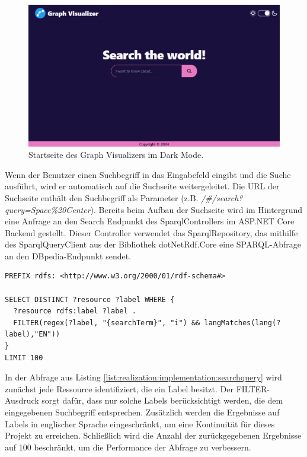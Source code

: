 \begin{figure}[h]
    \centering
    \includegraphics[height=.5\textwidth]{images/03/HomePageDark.png}
    \caption{Startseite des Graph Visualizers im Dark Mode.}
    \label{fig:realization:implementation:homepagedark}
\end{figure}

Wenn der Benutzer einen Suchbegriff in das Eingabefeld eingibt und die Suche ausführt, wird er automatisch auf die Suchseite weitergeleitet. Die URL der Suchseite enthält den Suchbegriff als Parameter (z.B. \textit{/\#/search?query=Space\%20Center}). Bereits beim Aufbau der Suchseite wird im Hintergrund eine Anfrage an den Search Endpunkt des SparqlControllers im ASP.NET Core Backend gestellt. Dieser Controller verwendet das SparqlRepository, das mithilfe des SparqlQueryClient aus der Bibliothek dotNetRdf.Core eine SPARQL-Abfrage an den DBpedia-Endpunkt sendet.

\begin{lstlisting}[caption={SPARQL-Abfrage zur Filterung von Ressourcen anhand des Labels}, label={list:realization:implementation:searchquery}]
PREFIX rdfs: <http://www.w3.org/2000/01/rdf-schema#>

SELECT DISTINCT ?resource ?label WHERE {
  ?resource rdfs:label ?label .
  FILTER(regex(?label, "{searchTerm}", "i") && langMatches(lang(?label),"EN"))
}
LIMIT 100
\end{lstlisting}

In der Abfrage aus Listing \ref{list:realization:implementation:searchquery} wird zunächst jede Ressource identifiziert, die ein Label besitzt. Der FILTER-Ausdruck sorgt dafür, dass nur solche Labels berücksichtigt werden, die dem eingegebenen Suchbegriff entsprechen. Zusätzlich werden die Ergebnisse auf Labels in englischer Sprache eingeschränkt, um eine Kontinuität für dieses Projekt zu erreichen. Schließlich wird die Anzahl der zurückgegebenen Ergebnisse auf 100 beschränkt, um die Performance der Abfrage zu verbessern.

